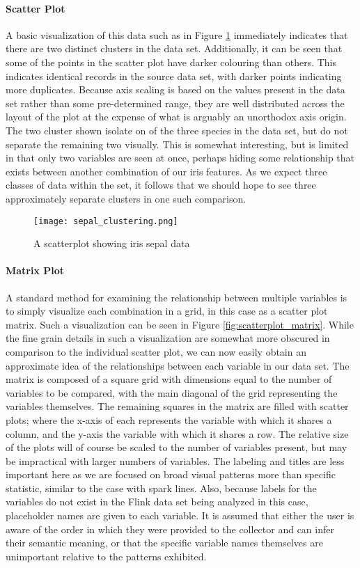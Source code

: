 \paragraph{Scatter Plot}
A basic visualization of this data such as in Figure \ref{fig:sepal_clustering} immediately indicates that there are two distinct clusters in the data set.  Additionally, it can be seen that some of the points in the scatter plot have darker colouring than others. This indicates identical records in the source data set, with darker points indicating more duplicates. Because axis scaling is based on the values present in the data set rather than some pre-determined range, they are well distributed across the layout of the plot at the expense of what is arguably an unorthodox axis origin. The two cluster shown isolate on of the three species in the data set, but do not separate the remaining two visually. This is somewhat interesting, but is limited in that only two variables are seen at once, perhaps hiding some relationship that exists between another combination of our iris features. As we expect three classes of data within the set, it follows that we should hope to see three approximately separate clusters in one such comparison.

\begin{figure}
	\centering
	\texttt{[image: sepal\_clustering.png]}
	\caption{A scatterplot showing iris sepal data}
	\label{fig:sepal_clustering}
\end{figure}

\paragraph{Matrix Plot}
A standard method for examining the relationship between multiple variables is to simply visualize each combination in a grid, in this case as a scatter plot matrix. Such a visualization can be seen in Figure \ref{fig:scatterplot_matrix}. While the fine grain details in such a visualization are somewhat more obscured in comparison to the individual scatter plot, we can now easily obtain an approximate idea of the relationships between each variable in our data set. The matrix is composed of a square grid with dimensions equal to the number of variables to be compared, with the main diagonal of the grid representing the variables themselves. The remaining squares in the matrix are filled with scatter plots; where the x-axis of each represents the variable with which it shares a column, and the y-axis the variable with which it shares a row. The relative size of the plots will of course be scaled to the number of variables present, but may be impractical with larger numbers of variables. The labeling and titles are less important here as we are focused on broad visual patterns more than specific statistic, similar to the case with spark lines. Also, because labels for the variables do not exist in the Flink data set being analyzed in this case, placeholder names are given to each variable. It is assumed that either the user is aware of the order in which they were provided to the collector and can infer their semantic meaning, or that the specific variable names themselves are unimportant relative to the patterns exhibited.

